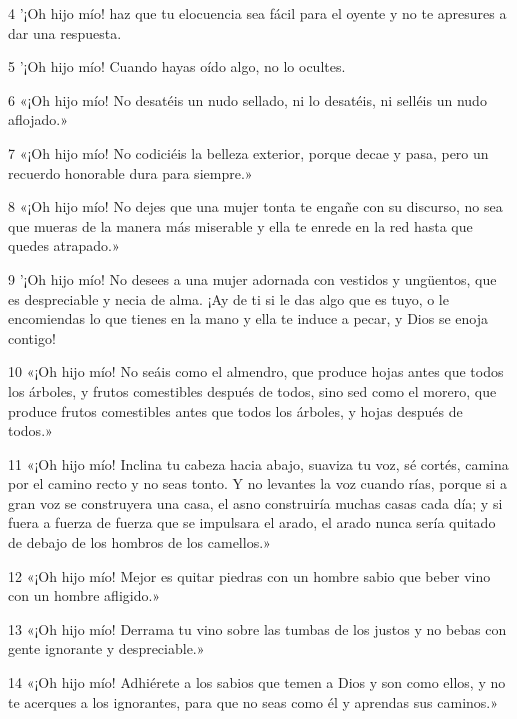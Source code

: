 \par 4 '¡Oh hijo mío! haz que tu elocuencia sea fácil para el oyente y no te apresures a dar una respuesta.

\par 5 '¡Oh hijo mío! Cuando hayas oído algo, no lo ocultes.

\par 6 «¡Oh hijo mío! No desatéis un nudo sellado, ni lo desatéis, ni selléis un nudo aflojado.»

\par 7 «¡Oh hijo mío! No codiciéis la belleza exterior, porque decae y pasa, pero un recuerdo honorable dura para siempre.»

\par 8 «¡Oh hijo mío! No dejes que una mujer tonta te engañe con su discurso, no sea que mueras de la manera más miserable y ella te enrede en la red hasta que quedes atrapado.»

\par 9 '¡Oh hijo mío! No desees a una mujer adornada con vestidos y ungüentos, que es despreciable y necia de alma. ¡Ay de ti si le das algo que es tuyo, o le encomiendas lo que tienes en la mano y ella te induce a pecar, y Dios se enoja contigo!

\par 10 «¡Oh hijo mío! No seáis como el almendro, que produce hojas antes que todos los árboles, y frutos comestibles después de todos, sino sed como el morero, que produce frutos comestibles antes que todos los árboles, y hojas después de todos.»

\par 11 «¡Oh hijo mío! Inclina tu cabeza hacia abajo, suaviza tu voz, sé cortés, camina por el camino recto y no seas tonto. Y no levantes la voz cuando rías, porque si a gran voz se construyera una casa, el asno construiría muchas casas cada día; y si fuera a fuerza de fuerza que se impulsara el arado, el arado nunca sería quitado de debajo de los hombros de los camellos.»

\par 12 «¡Oh hijo mío! Mejor es quitar piedras con un hombre sabio que beber vino con un hombre afligido.»

\par 13 «¡Oh hijo mío! Derrama tu vino sobre las tumbas de los justos y no bebas con gente ignorante y despreciable.»

\par 14 «¡Oh hijo mío! Adhiérete a los sabios que temen a Dios y son como ellos, y no te acerques a los ignorantes, para que no seas como él y aprendas sus caminos.»

